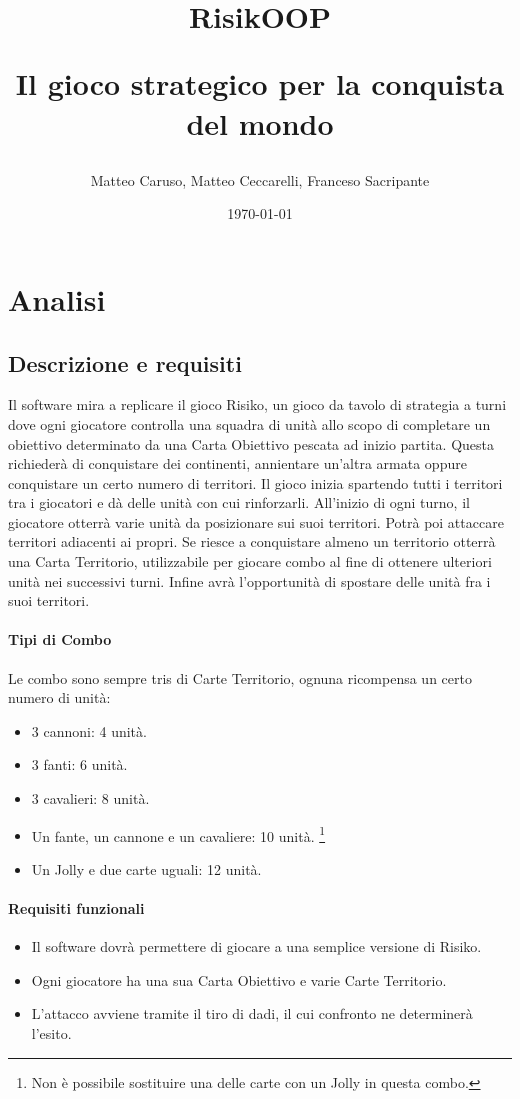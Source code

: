 \documentclass[a4paper,12pt]{report}
\title{
RisikOOP \\
\begin{large}
Il gioco strategico per la conquista del mondo
\end{large}
}
\author{Matteo Caruso, Matteo Ceccarelli, Franceso Sacripante}
\date{\today}
\begin{document}
\maketitle

\tableofcontents

\chapter{Analisi}

\section{Descrizione e requisiti}

Il software mira a replicare il gioco Risiko, un gioco da tavolo di strategia a turni dove ogni giocatore controlla una squadra di unità allo scopo di completare un obiettivo determinato da una Carta Obiettivo pescata ad inizio partita.
Questa richiederà di conquistare dei continenti, annientare un'altra armata oppure conquistare un certo numero di territori.
Il gioco inizia spartendo tutti i territori tra i giocatori e dà delle unità con cui rinforzarli.
All'inizio di ogni turno, il giocatore otterrà varie unità da posizionare sui suoi territori.
Potrà poi attaccare territori adiacenti ai propri.
Se riesce a conquistare almeno un territorio otterrà una Carta Territorio, utilizzabile per giocare combo al fine di ottenere ulteriori unità nei successivi turni.
Infine avrà l'opportunità di spostare delle unità fra i suoi territori.

\subsubsection{Tipi di Combo}
Le combo sono sempre tris di Carte Territorio, ognuna ricompensa un certo numero di unità:
\begin{itemize}
	\item 3 cannoni: 4 unità.
	\item 3 fanti: 6 unità.
	\item 3 cavalieri: 8 unità.
	\item Un fante, un cannone e un cavaliere: 10 unità. \footnote{Non è possibile sostituire una delle carte con un Jolly in questa combo.}
	\item Un Jolly e due carte uguali: 12 unità.
\end{itemize}

\subsubsection{Requisiti funzionali}
\begin{itemize}
	\item Il software dovrà permettere di giocare a una semplice versione di Risiko.
	\item Ogni giocatore ha una sua Carta Obiettivo e varie Carte Territorio.
	\item L'attacco avviene tramite il tiro di dadi, il cui confronto ne determinerà l'esito.
\end{itemize}
\end{document}

